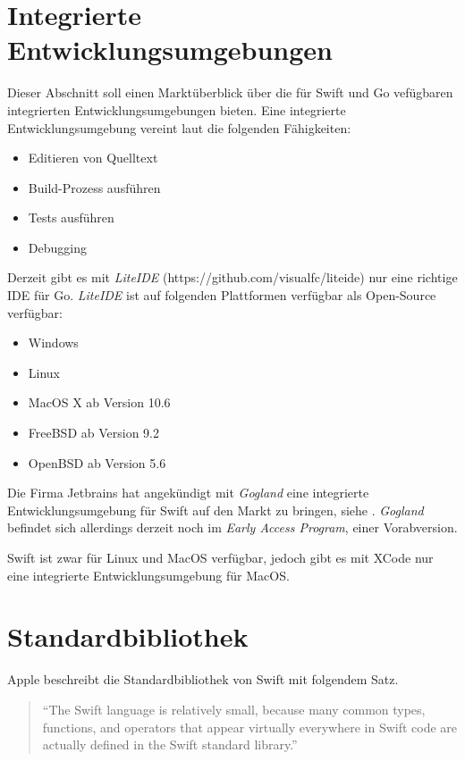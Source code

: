 \section{Integrierte Entwicklungsumgebungen}
\label{sec:IDE}
Dieser Abschnitt soll einen Marktüberblick über die für Swift und Go vefügbaren integrierten Entwicklungsumgebungen bieten.
Eine integrierte Entwicklungsumgebung vereint laut \cite[]{TechnoPedia} die folgenden Fähigkeiten:

\begin{itemize}
    \item Editieren von Quelltext
    \item Build-Prozess ausführen
    \item Tests ausführen
    \item Debugging
\end{itemize}

Derzeit gibt es mit \textit{LiteIDE} (https://github.com/visualfc/liteide) nur eine richtige \gls{IDE} für Go.
\textit{LiteIDE} ist auf folgenden Plattformen verfügbar als Open-Source verfügbar:

\begin{itemize}
    \item Windows 
    \item Linux
    \item MacOS X ab Version 10.6
    \item FreeBSD ab Version 9.2
    \item OpenBSD ab Version 5.6
\end{itemize}

Die Firma Jetbrains hat angekündigt mit \textit{Gogland}\cite[]{Gogland} eine integrierte Entwicklungsumgebung für Swift auf den Markt zu bringen, siehe \cite[]{Gogland.Heise}.
\textit{Gogland} befindet sich allerdings derzeit noch im \textit{Early Access Program}, einer Vorabversion.

Swift ist zwar für Linux und MacOS verfügbar, jedoch gibt es mit XCode nur eine integrierte Entwicklungsumgebung für MacOS.

\section{Standardbibliothek}
Apple beschreibt die Standardbibliothek von Swift mit folgendem Satz.
\begin{quote}
\enquote{The Swift language is relatively small, because many common types, functions, and operators that appear virtually everywhere in Swift code are actually defined in the Swift standard library.} \cite[S.427]{Apple.2017}
\end{quote}

